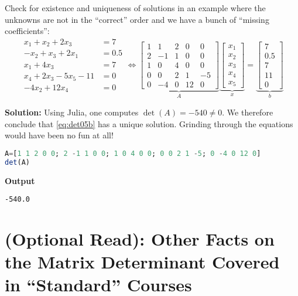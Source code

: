 \begin{example}
\label{ex:Det05} 
Check for existence and uniqueness of solutions in an example where the unknowns are not in the ``correct'' order and we have a bunch of ``missing coefficients'':
\begin{equation}
\label{eq:det05b}
\begin{aligned}
x_1+x_2+2x_3 &=7 \\
-x_2+x_3+2x_1&=0.5\\
x_1 + 4 x_3 &=7 \\
x_4+ 2 x_3 - 5x_5-11&= 0 \\
-4x_2 + 12 x_4 &= 0
\end{aligned}
\iff \underbrace{\left[\begin{array}{rrrrr} 1 & 1 & 2 & 0 & 0\\
2 & -1 & 1  & 0 & 0\\ 1 & 0 & 4 & 0 & 0 \\ 0 & 0 & 2 & 1 & -5 \\ 0 & -4 & 0 & 12 & 0\end{array}\right]}_{A} \underbrace{\left[\begin{array}{c} x_1\\ x_2 \\ x_3 \\x_4 \\x_5\end{array}\right]}_{x} =   \underbrace{\left[\begin{array}{c} 7\\ 0.5 \\ 7 \\ 11 \\ 0\end{array}\right]}_{b}
\end{equation}

\end{example}

\textbf{Solution:}
Using Julia, one computes $\det(A) = -540 \neq 0$. We therefore conclude that \eqref{eq:det05b} has a unique solution. Grinding through the equations would have been no fun at all!
\begin{lstlisting}[language=Julia,style=mystyle]
A=[1 1 2 0 0; 2 -1 1 0 0; 1 0 4 0 0; 0 0 2 1 -5; 0 -4 0 12 0]
det(A)
\end{lstlisting}
\textbf{Output}
\begin{verbatim}
-540.0
\end{verbatim}
\Qed



\section{(Optional Read): Other Facts on the Matrix Determinant Covered in ``Standard'' Courses} 

